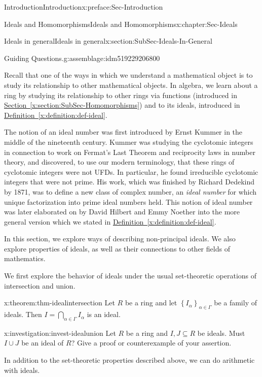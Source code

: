 \documentclass[oneside,10pt,]{book}
\newcommand{\xreffont}{\relax}
\numberwithin{equation}{section}
\newcommand{\set}[1]{\left\{ {#1} \right\}}
\begin{document}
\begin{preface}{Introduction}{}{Introduction}{}{}{x:preface:Sec-Introduction}
\begin{chapterptx}{Ideals and Homomorphisms}{}{Ideals and Homomorphisms}{}{}{x:chapter:Sec-Ideals}
\begin{sectionptx}{Ideals in general}{}{Ideals in general}{}{}{x:section:SubSec-Ideals-In-General}
\begin{assemblage}{Guiding Questions.}{g:assemblage:idm519229206800}
\begin{itemize}[label=\textbullet]
\end{itemize}
%
\end{assemblage}
\begin{introduction}{}%
Recall that one of the ways in which we understand a mathematical object is to study its relationship to other mathematical objects. In algebra, we learn about a ring by studying its relationship to other rings via functions (introduced in \hyperref[x:section:SubSec-Homomorphisms]{Section~{\xreffont\ref{x:section:SubSec-Homomorphisms}}}) and to its ideals, introduced in \hyperref[x:definition:def-ideal]{Definition~{\xreffont\ref{x:definition:def-ideal}}}.%
\par
The notion of an ideal number was first introduced by Ernst Kummer in the middle of the nineteenth century. Kummer was studying the cyclotomic integers in connection to work on Fermat's Last Theorem and reciprocity laws in number theory, and discovered, to use our modern terminology, that these rings of cyclotomic integers were not UFDs. In particular, he found irreducible cyclotomic integers that were not prime. His work, which was finished by Richard Dedekind by 1871, was to define a new class of complex number, an \emph{ideal number} for which unique factorization into prime ideal numbers held. This notion of ideal number was later elaborated on by David Hilbert and Emmy Noether into the more general version which we stated in \hyperref[x:definition:def-ideal]{Definition~{\xreffont\ref{x:definition:def-ideal}}}.%
\par
In this section, we explore ways of describing non-principal ideals. We also explore properties of ideals, as well as their connections to other fields of mathematics.%
\end{introduction}%
We first explore the behavior of ideals under the usual set-theoretic operations of intersection and union.%
\begin{theorem}{}{}{x:theorem:thm-idealintersection}%
Let \(R\) be a ring and let \(\set{I_{\alpha}}_{\alpha\in \Gamma}\) be a family of ideals. Then \(I = \bigcap\limits_{\alpha\in \Gamma} I_\alpha\) is an ideal.%
\end{theorem}
\begin{investigation}{}{x:investigation:invest-idealunion}%
Let \(R\) be a ring and \(I,J\subseteq R\) be ideals. Must \(I\cup J\) be an ideal of \(R\)? Give a proof or counterexample of your assertion.%
\end{investigation}
In addition to the set-theoretic properties described above, we can do arithmetic with ideals.%

\end{sectionptx}
\end{chapterptx}
\end{preface}
\end{document}
